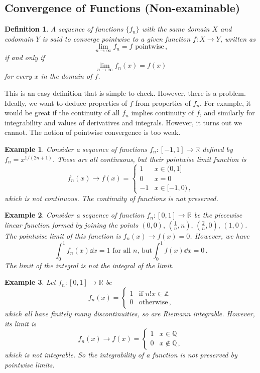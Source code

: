 \documentclass{article}
\theoremstyle{plain}\theoremheaderfont{\normalfont\itshape}\theorembodyfont{\rmfamily}\theoremseparator{.}\newtheorem*{rem}{Remark}\newtheorem*{ex}{Example}\newtheorem*{proof}{Proof}\newtheorem*{altp}{Alternative proof}
\theoremstyle{plain}\theoremheaderfont{\normalfont\bfseries}\theorembodyfont{\rmfamily}\theoremseparator{.}\newtheorem{thm}{Theorem}[section]\newtheorem{lem}[thm]{Lemma}\newtheorem{prop}[thm]{Proposition}\newtheorem*{cor}{Corollary}\newtheorem{defn}[thm]{Definition}\newtheorem{clm}[thm]{Claim}\newtheorem{clminproof}{Claim}
\theoremstyle{break}\theoremheaderfont{\normalfont\itshape}\theorembodyfont{\rmfamily}\theoremseparator{.\medskip}\newtheorem*{proofskip}{Proof}\newtheorem*{exs}{Examples}\newtheorem*{rems}{Remarks}
\theoremstyle{break}\theoremheaderfont{\normalfont\bfseries}\theorembodyfont{\rmfamily}\theoremseparator{.\medskip}\newtheorem{lemskip}[thm]{Lemma}\newtheorem{defnskip}[thm]{Definition}\newtheorem{propskip}[thm]{Proposition}\newtheorem{thmskip}[thm]{Theorem}
\numberwithin{equation}{section}
\begin{document}
	\subsection{Convergence of Functions (Non-examinable)}
	\begin{defn}
		A sequence of functions \(\{f_n\}\) with the same domain \(X\) and codomain \(Y\) is said to \textit{converge pointwise} to a given function \(f:X\to Y\), written as
		\[\lim_{n\to\infty}f_n=f\text{ pointwise}\,,\]
		if and only if
		\[\lim_{n\to\infty}f_n(x)=f(x)\]
		for every \(x\) in the domain of \(f\).
	\end{defn}
	This is an easy definition that is simple to check. However, there is a problem. Ideally, we want to deduce properties of \(f\) from properties of \(f_n\). For example, it would be great if the continuity of all \(f_n\) implies continuity of \(f\), and similarly for integrability and values of derivatives and integrals. However, it turns out we cannot. The notion of pointwise convergence is too weak.
	\begin{ex}
		Consider a sequence of functions \(f_n:[-1,1]\to\mathbb{R}\) defined by \(f_n=x^{1/(2n+1)}\). These are all continuous, but their pointwise limit function is
		\[f_n(x)\to f(x)=\begin{cases}
			1 & x\in(0,1]\\
			0 & x=0\\
			-1 & x\in[-1,0)\,,
		\end{cases}\]
		which is not continuous. The continuity of functions is not preserved.
	\end{ex}
	\begin{ex}
		Consider a sequence of function \(f_n:[0,1]\to\mathbb{R}\) be the piecewise linear function formed by joining the points \((0,0),\,(\frac{1}{n},n),\,(\frac{2}{n},0),\,(1,0)\). The pointwise limit of this function is \(f_n(x)\to f(x)=0\). However, we have
		\[\int_{0}^{1}f_n(x)\dd{x}=1\text{ for all }n\text{, but}\int_0^1 f(x)\dd{x}=0\,.\]
		The limit of the integral is not the integral of the limit.
	\end{ex}
	\begin{ex}
		Let \(f_n:[0,1]\to\mathbb{R}\) be
		\[f_n(x)=\begin{cases}
			1 & \text{if }n! x\in\mathbb{Z}\\
			0 & \text{otherwise}\,,
		\end{cases}\]
		which all have finitely many discontinuities, so are Riemann integrable. However, its limit is
		\[f_n(x)\to f(x)=\begin{cases}
			1 & x\in\mathbb{Q}\\
			0 & x\notin\mathbb{Q}\,,
		\end{cases}\]
		which is not integrable. So the integrability of a function is not preserved by pointwise
		limits.
	\end{ex}
\end{document}
